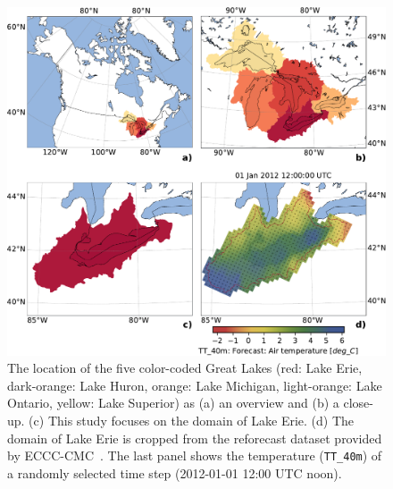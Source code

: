 \documentclass{article}
\begin{document}
	\begin{figure}[h!]
		\centering
		\includegraphics[width=0.75\linewidth]{figures/shapes_great_lakes.pdf}
		\caption{The location of the five color-coded Great Lakes (red: Lake Erie, dark-orange: Lake Huron, orange: Lake Michigan, light-orange: Lake Ontario, yellow: Lake Superior) as (a) an overview and (b) a close-up. (c) This study focuses on the domain of Lake Erie. (d) The domain of Lake Erie is cropped from the reforecast dataset provided by ECCC-CMC~\citep{gasset2017c,gasset2018a}. The last panel shows the temperature (\texttt{TT\_40m}) of a randomly selected time step (2012-01-01 12:00 UTC noon).}
		\label{fig:LakeErie_maps}
	\end{figure}
	

	
	
	
\end{document}

